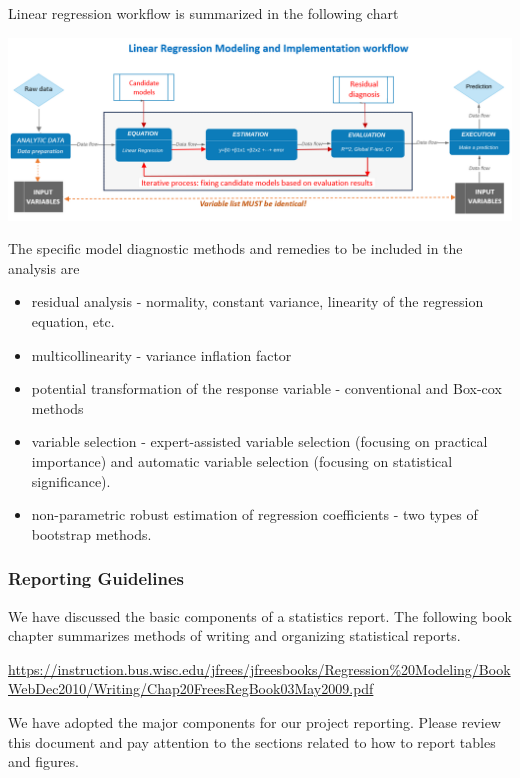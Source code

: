 \documentclass[
]{book}
\begin{document}
Linear regression workflow is summarized in the following chart

\begin{center}\includegraphics[width=1\linewidth]{img05/w05-LinearRegWorkflow} \end{center}

The specific model diagnostic methods and remedies to be included in the analysis are

\begin{itemize}
\item
  residual analysis - normality, constant variance, linearity of the regression equation, etc.
\item
  multicollinearity - variance inflation factor
\item
  potential transformation of the response variable - conventional and Box-cox methods
\item
  variable selection - expert-assisted variable selection (focusing on practical importance) and automatic variable selection (focusing on statistical significance).
\item
  non-parametric robust estimation of regression coefficients - two types of bootstrap methods.
\end{itemize}

\hypertarget{reporting-guidelines}{%
\subsubsection{Reporting Guidelines}\label{reporting-guidelines}}

We have discussed the basic components of a statistics report. The following book chapter summarizes methods of writing and organizing statistical reports.

\url{https://instruction.bus.wisc.edu/jfrees/jfreesbooks/Regression\%20Modeling/BookWebDec2010/Writing/Chap20FreesRegBook03May2009.pdf}

We have adopted the major components for our project reporting. Please review this document and pay attention to the sections related to how to report tables and figures.
\end{document}

